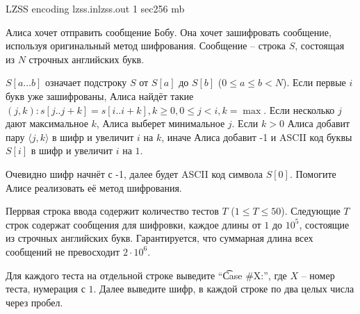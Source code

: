 
\begin{problem}{LZSS encoding}
{lzss.in}{lzss.out}
{1 sec}{256 mb}{}

Алиса хочет отправить сообщение Бобу.
Она хочет зашифровать сообщение, используя оригинальный метод шифрования.
Сообщение -- строка $S$, состоящая из $N$ строчных английских букв.

$S[a\dots b]$ означает подстроку $S$ от $S[a]$ до $S[b]$ ($0 \le a \le b < N$). 
Если первые $i$ букв уже зашифрованы, Алиса найдёт такие $(j, k) \colon s[j..j+k] = s[i..i+k], k \ge 0, 0 \le j < i, k = \max$.
Если несколько $j$ дают максимальное $k$, Алиса выберет минимальное $j$.
Если $k > 0$ Алиса добавит пару $\langle j, k \rangle$ в шифр и увеличит $i$ на $k$, иначе
Алиса добавит -1 и ASCII код буквы $S[i]$ в шифр и увеличит $i$ на $1$.

Очевидно шифр начнёт с -1, далее будет ASCII код символа $S[0]$.
Помогите Алисе реализовать её метод шифрования.

\InputFile

Перрвая строка ввода содержит количество тестов $T$ ($1 \le T \le 50$). 
Следующие $T$ строк содержат сообщения для шифровки, каждое длины от $1$ до $10^5$, состоящие из строчных английских букв. 
Гарантируется, что суммарная длина всех сообщений не превосходит $2 \cdot 10^6$.

\OutputFile

Для каждого теста на отдельной строке выведите ``\t{Case \#{}X:}'', где $X$ -- номер теста, нумерация с $1$. 
Далее выведите шифр, в каждой строке по два целых числа через пробел.

\Examples

\begin{example}
%
\end{example}

\end{problem}
